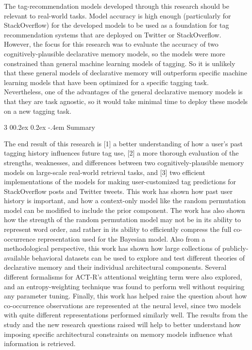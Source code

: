 \documentclass[man,floatsintext,donotrepeattitle]{apa6}
\makeatletter
\renewcommand{\subsubsection}{%
  \@startsection
  {subsubsection}%
  {3}%
  {\parindent}%
  {0\baselineskip \@plus 0.2ex \@minus 0.2ex}%
  {-.4em}%
  {\normalfont\normalsize\bfseries\addperi}}
\makeatother
\begin{document}
The tag-recommendation models developed through this research should be relevant to real-world tasks.
Model accuracy is high enough (particularly for StackOverflow) for the developed models to be used as a foundation for tag recommendation systems that are deployed on Twitter or StackOverflow.
However, the focus for this research was to evaluate the accuracy of two cognitively-plausible declarative memory models, so the models were more constrained than general machine learning models of tagging.
So it is unlikely that these general models of declarative memory will outperform specific machine learning models that have been optimized for a specific tagging task. 
Nevertheless, one of the advantages of the general declarative memory models is that they are task agnostic, so it would take minimal time to deploy these models on a new tagging task.

\subsubsection{Summary}

The end result of this research is [1] a better understanding of how a user's past tagging history influences future tag use,
[2] a more thorough evaluation of the strengths, weaknesses, and differences between two cognitively-plausible memory models on large-scale real-world retrieval tasks,
and [3] two efficient implementations of the models for making user-customized tag predictions for StackOverflow posts and Twitter tweets. 
This work has shown how past user history is important, and how a context-only model like the random permutation model can be modified to include the prior component.
The work has also shown how the strength of the random permutation model may not be in its ability to represent word order,
and rather in its ability to efficiently compress the full co-occurrence representation used for the Bayesian model.
Also from a methodological perspective,
this work has shown how large collections of publicly-available behavioral datasets can be used to explore and test different theories of declarative memory and their individual architectural components.
Several different formalisms for ACT-R's attentional weighting term were also explored, and an entropy-weighting technique was found to perform well without requiring any parameter tuning.
Finally, this work has helped raise the question about how co-occurrence observations are represented at the neural level, since two models with quite different representations performed similarly well.
The results from the study and the new research questions raised will help to better understand how imposing specific architectural constraints on memory models influence what information is retrieved.
\end{document}
